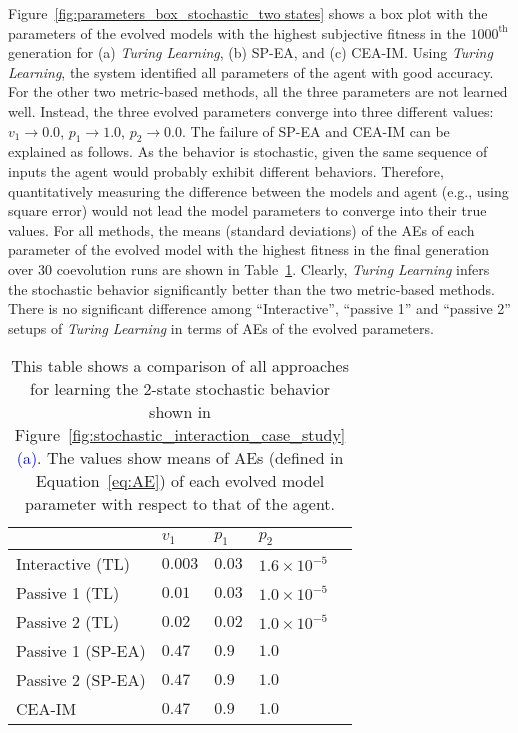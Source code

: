 Figure~\ref{fig:parameters_box_stochastic_two states} shows a box plot with the parameters of the evolved models with the highest subjective fitness in the $1000^\mathrm{th}$ generation for (a) \textit{Turing Learning}, (b) SP-EA, and (c) CEA-IM. Using \textit{Turing Learning}, the system identified all parameters of the agent with good accuracy. For the other two metric-based methods, all the three parameters are not learned well. Instead, the three evolved parameters converge into three different values: $v_1 \rightarrow 0.0$, $p_1 \rightarrow 1.0$, $p_2 \rightarrow 0.0$. The failure of SP-EA and CEA-IM can be explained as follows. As the behavior is stochastic, given the same sequence of inputs the agent would probably exhibit different behaviors. Therefore, quantitatively measuring the difference between the models and agent (e.g., using square error) would not lead the model parameters to converge into their true values. For all methods, the means (standard deviations) of the AEs of each parameter of the evolved model with the highest fitness in the final generation over $30$ coevolution runs are shown in Table~\ref{table:relative_accuracy_stochastic_2states}. Clearly, \textit{Turing Learning} infers the stochastic behavior significantly better than the two metric-based methods. There is no significant difference among ``Interactive'', ``passive 1'' and ``passive 2'' setups of \textit{Turing Learning} in terms of AEs of the evolved parameters. 

\begin{table}[!t] 
\caption{This table shows a comparison of all approaches for learning the 2-state stochastic behavior shown in Figure~\ref{fig:stochastic_interaction_case_study}\textcolor{blue}{(a)}. The values show means of AEs (defined in Equation~\ref{eq:AE}) of each evolved model parameter with respect to that of the agent.} 
\renewcommand{\arraystretch}{1.1}
\centering %
\begin{tabular}{l l l l l} %
\hline\hline  %
 & $v_1$ & $p_1$ & $p_2$ &  \\  
\hline   %
Interactive (TL) & $0.003$ & $0.03$ & $1.6\times10^{-5}$ \\ %
Passive 1 (TL) & $0.01$ & $0.03$ & $1.0\times10^{-5}$ \\ 
Passive 2 (TL) & $0.02$ & $0.02$ & $1.0\times10^{-5}$ \\ 
Passive 1 (SP-EA) & $0.47$ & $0.9$ & $1.0$ \\ 
Passive 2 (SP-EA) & $0.47$ & $0.9$ & $1.0$ \\ 
CEA-IM & $0.47$ & $0.9$ & $1.0$ \\
\hline %
\end{tabular} 
\label{table:relative_accuracy_stochastic_2states} 
\end{table} 

